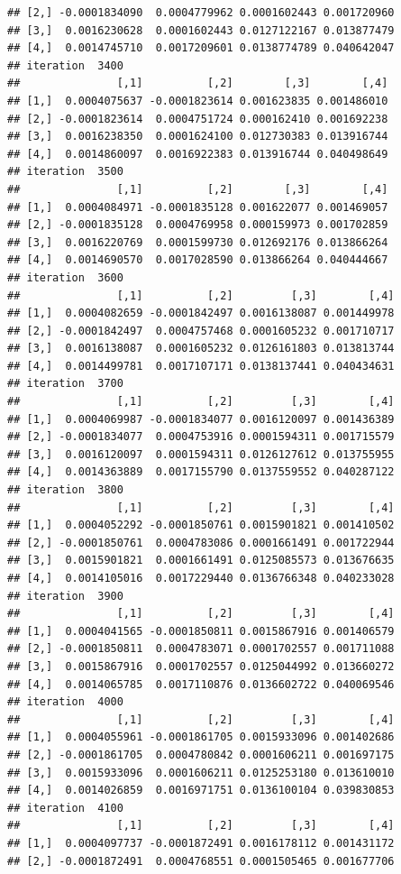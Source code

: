 \documentclass[
]{article}
\begin{document}
\begin{verbatim}
## [2,] -0.0001834090  0.0004779962 0.0001602443 0.001720960
## [3,]  0.0016230628  0.0001602443 0.0127122167 0.013877479
## [4,]  0.0014745710  0.0017209601 0.0138774789 0.040642047
## iteration  3400 
##               [,1]          [,2]        [,3]        [,4]
## [1,]  0.0004075637 -0.0001823614 0.001623835 0.001486010
## [2,] -0.0001823614  0.0004751724 0.000162410 0.001692238
## [3,]  0.0016238350  0.0001624100 0.012730383 0.013916744
## [4,]  0.0014860097  0.0016922383 0.013916744 0.040498649
## iteration  3500 
##               [,1]          [,2]        [,3]        [,4]
## [1,]  0.0004084971 -0.0001835128 0.001622077 0.001469057
## [2,] -0.0001835128  0.0004769958 0.000159973 0.001702859
## [3,]  0.0016220769  0.0001599730 0.012692176 0.013866264
## [4,]  0.0014690570  0.0017028590 0.013866264 0.040444667
## iteration  3600 
##               [,1]          [,2]         [,3]        [,4]
## [1,]  0.0004082659 -0.0001842497 0.0016138087 0.001449978
## [2,] -0.0001842497  0.0004757468 0.0001605232 0.001710717
## [3,]  0.0016138087  0.0001605232 0.0126161803 0.013813744
## [4,]  0.0014499781  0.0017107171 0.0138137441 0.040434631
## iteration  3700 
##               [,1]          [,2]         [,3]        [,4]
## [1,]  0.0004069987 -0.0001834077 0.0016120097 0.001436389
## [2,] -0.0001834077  0.0004753916 0.0001594311 0.001715579
## [3,]  0.0016120097  0.0001594311 0.0126127612 0.013755955
## [4,]  0.0014363889  0.0017155790 0.0137559552 0.040287122
## iteration  3800 
##               [,1]          [,2]         [,3]        [,4]
## [1,]  0.0004052292 -0.0001850761 0.0015901821 0.001410502
## [2,] -0.0001850761  0.0004783086 0.0001661491 0.001722944
## [3,]  0.0015901821  0.0001661491 0.0125085573 0.013676635
## [4,]  0.0014105016  0.0017229440 0.0136766348 0.040233028
## iteration  3900 
##               [,1]          [,2]         [,3]        [,4]
## [1,]  0.0004041565 -0.0001850811 0.0015867916 0.001406579
## [2,] -0.0001850811  0.0004783071 0.0001702557 0.001711088
## [3,]  0.0015867916  0.0001702557 0.0125044992 0.013660272
## [4,]  0.0014065785  0.0017110876 0.0136602722 0.040069546
## iteration  4000 
##               [,1]          [,2]         [,3]        [,4]
## [1,]  0.0004055961 -0.0001861705 0.0015933096 0.001402686
## [2,] -0.0001861705  0.0004780842 0.0001606211 0.001697175
## [3,]  0.0015933096  0.0001606211 0.0125253180 0.013610010
## [4,]  0.0014026859  0.0016971751 0.0136100104 0.039830853
## iteration  4100 
##               [,1]          [,2]         [,3]        [,4]
## [1,]  0.0004097737 -0.0001872491 0.0016178112 0.001431172
## [2,] -0.0001872491  0.0004768551 0.0001505465 0.001677706

\end{verbatim}
\end{document}

